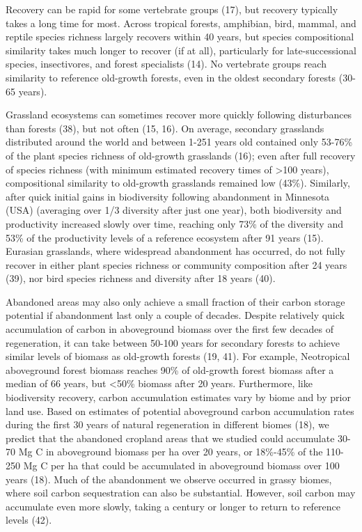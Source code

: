 \documentclass[9pt,twocolumn,twoside,lineno]{pnas-new}
\begin{document}
Recovery can be rapid for some vertebrate groups (17), but recovery typically takes a long time for most.
Across tropical forests, amphibian, bird, mammal, and reptile species richness largely recovers within 40 years, but species compositional similarity takes much longer to recover (if at all), particularly for late-successional species, insectivores, and forest specialists (14).
No vertebrate groups reach similarity to reference old-growth forests, even in the oldest secondary forests (30-65 years).

Grassland ecosystems can sometimes recover more quickly following disturbances than forests (38), but not often (15, 16).
On average, secondary grasslands distributed around the world and between 1-251 years old contained only 53-76\% of the plant species richness of old-growth grasslands (16); even after full recovery of species richness (with minimum estimated recovery times of \textgreater100 years), compositional similarity to old-growth grasslands remained low (43\%).
Similarly, after quick initial gains in biodiversity following abandonment in Minnesota (USA) (averaging over 1/3 diversity after just one year), both biodiversity and productivity increased slowly over time, reaching only 73\% of the diversity and 53\% of the productivity levels of a reference ecosystem after 91 years (15).
Eurasian grasslands, where widespread abandonment has occurred, do not fully recover in either plant species richness or community composition after 24 years (39), nor bird species richness and diversity after 18 years (40).

Abandoned areas may also only achieve a small fraction of their carbon storage potential if abandonment last only a couple of decades.
Despite relatively quick accumulation of carbon in aboveground biomass over the first few decades of regeneration, it can take between 50-100 years for secondary forests to achieve similar levels of biomass as old-growth forests (19, 41).
For example, Neotropical aboveground forest biomass reaches 90\% of old-growth forest biomass after a median of 66 years, but \textless50\% biomass after 20 years.
Furthermore, like biodiversity recovery, carbon accumulation estimates vary by biome and by prior land use.
Based on estimates of potential aboveground carbon accumulation rates during the first 30 years of natural regeneration in different biomes (18), we predict that the abandoned cropland areas that we studied could accumulate 30-70 Mg C in aboveground biomass per ha over 20 years, or 18\%-45\% of the 110-250 Mg C per ha that could be accumulated in aboveground biomass over 100 years (18).
Much of the abandonment we observe occurred in grassy biomes, where soil carbon sequestration can also be substantial.
However, soil carbon may accumulate even more slowly, taking a century or longer to return to reference levels (42).
\end{document}
